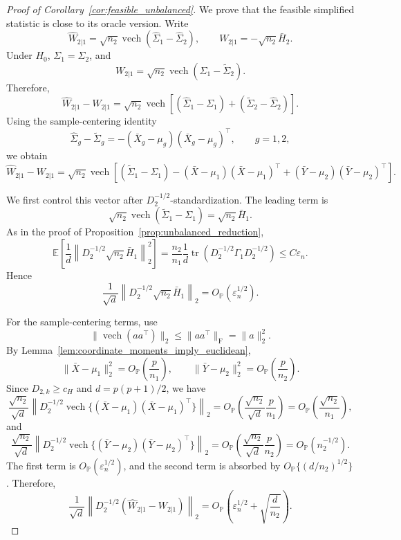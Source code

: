 \documentclass[
  12pt]{article}
\theoremstyle{plain}
\theoremstyle{definition}
\theoremstyle{remark}
\begin{document}
\begin{proof}[Proof of Corollary~\ref{cor:feasible_unbalanced}]
We prove that the feasible simplified statistic is close to its oracle version.
Write
\[
\widehat W_{2|1}
=
\sqrt{n_2}\operatorname{vech}(\widehat\Sigma_1-\widehat\Sigma_2),
\qquad
W_{2|1}
=
-\sqrt{n_2}\bar H_2.
\]
Under \(H_0\), \(\Sigma_1=\Sigma_2\), and
\[
W_{2|1}
=
\sqrt{n_2}\operatorname{vech}(\Sigma_1-\widetilde\Sigma_2).
\]
Therefore,
\[
\widehat W_{2|1}-W_{2|1}
=
\sqrt{n_2}
\operatorname{vech}
\left[
(\widehat\Sigma_1-\Sigma_1)
+
(\widetilde\Sigma_2-\widehat\Sigma_2)
\right].
\]
Using the sample-centering identity
\[
\widehat\Sigma_g-\widetilde\Sigma_g
=
-(\bar X_g-\mu_g)(\bar X_g-\mu_g)^\top,
\qquad g=1,2,
\]
we obtain
\[
\widehat W_{2|1}-W_{2|1}
=
\sqrt{n_2}
\operatorname{vech}
\left[
(\widetilde\Sigma_1-\Sigma_1)
-
(\bar X-\mu_1)(\bar X-\mu_1)^\top
+
(\bar Y-\mu_2)(\bar Y-\mu_2)^\top
\right].
\]

We first control this vector after \(D_2^{-1/2}\)-standardization.  The leading
term is
\[
\sqrt{n_2}
\operatorname{vech}(\widetilde\Sigma_1-\Sigma_1)
=
\sqrt{n_2}\bar H_1.
\]
As in the proof of Proposition~\ref{prop:unbalanced_reduction},
\[
\mathbb E
\left[
\frac1d
\left\|
D_2^{-1/2}\sqrt{n_2}\bar H_1
\right\|_2^2
\right]
=
\frac{n_2}{n_1}
\frac1d
\operatorname{tr}
(D_2^{-1/2}\Gamma_1D_2^{-1/2})
\le
C\varepsilon_n.
\]
Hence
\[
\frac1{\sqrt d}
\left\|
D_2^{-1/2}\sqrt{n_2}\bar H_1
\right\|_2
=
O_{\mathbb P}(\varepsilon_n^{1/2}).
\]

For the sample-centering terms, use
\[
\|\operatorname{vech}(aa^\top)\|_2
\le
\|aa^\top\|_{\mathrm F}
=
\|a\|_2^2 .
\]
By Lemma~\ref{lem:coordinate_moments_imply_euclidean},
\[
\|\bar X-\mu_1\|_2^2
=
O_{\mathbb P}\left(\frac p{n_1}\right),
\qquad
\|\bar Y-\mu_2\|_2^2
=
O_{\mathbb P}\left(\frac p{n_2}\right).
\]
Since \(D_{2,k}\ge c_H\) and \(d=p(p+1)/2\), we have
\[
\frac{\sqrt{n_2}}{\sqrt d}
\left\|
D_2^{-1/2}
\operatorname{vech}
\{(\bar X-\mu_1)(\bar X-\mu_1)^\top\}
\right\|_2
=
O_{\mathbb P}
\left(
\frac{\sqrt{n_2}}{\sqrt d}\frac p{n_1}
\right)
=
O_{\mathbb P}
\left(
\frac{\sqrt{n_2}}{n_1}
\right),
\]
and
\[
\frac{\sqrt{n_2}}{\sqrt d}
\left\|
D_2^{-1/2}
\operatorname{vech}
\{(\bar Y-\mu_2)(\bar Y-\mu_2)^\top\}
\right\|_2
=
O_{\mathbb P}
\left(
\frac{\sqrt{n_2}}{\sqrt d}\frac p{n_2}
\right)
=
O_{\mathbb P}(n_2^{-1/2}).
\]
The first term is \(O_{\mathbb P}(\varepsilon_n^{1/2})\), and the second term
is absorbed by \(O_{\mathbb P}\{(d/n_2)^{1/2}\}\).  Therefore,
\[
\frac1{\sqrt d}
\left\|
D_2^{-1/2}(\widehat W_{2|1}-W_{2|1})
\right\|_2
=
O_{\mathbb P}
\left(
\varepsilon_n^{1/2}
+
\sqrt{\frac d{n_2}}
\right).
\]


\end{proof}
\end{document}
